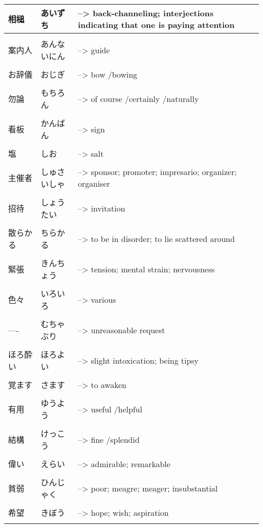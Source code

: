 \documentclass{article}
\begin{document}
\begin{tabular}{ l | l p{14cm}  }
相槌 & あいずち &--> back-channeling; interjections indicating that one is paying attention \\ \hline\\[-1em]
案内人 & あんないにん &--> guide \\ \hline\\[-1em]
お辞儀 & おじぎ &--> bow /bowing \\ \hline\\[-1em]
勿論 & もちろん &--> of course /certainly /naturally \\ \hline\\[-1em]
看板 & かんばん &--> sign \\ \hline\\[-1em]
塩 & しお &--> salt \\ \hline\\[-1em]
主催者 & しゅさいしゃ &--> sponsor; promoter; impresario; organizer; organiser \\ \hline\\[-1em]
招待 & しょうたい &--> invitation \\ \hline\\[-1em]
散らかる & ちらかる &--> to be in disorder; to lie scattered around \\ \hline\\[-1em]
緊張 & きんちょう &--> tension; mental strain; nervousness \\ \hline\\[-1em]
色々 & いろいろ &--> various \\ \hline\\[-1em]
---- & むちゃぶり &--> unreasonable request \\ \hline\\[-1em]
ほろ酔い & ほろよい &--> slight intoxication; being tipsy \\ \hline\\[-1em]
覚ます & さます &--> to awaken \\ \hline\\[-1em]
有用 & ゆうよう &--> useful /helpful \\ \hline\\[-1em]
結構 & けっこう &--> fine /splendid \\ \hline\\[-1em]
偉い & えらい &--> admirable; remarkable \\ \hline\\[-1em]
貧弱 & ひんじゃく &--> poor; meagre; meager; insubstantial \\ \hline\\[-1em]
希望 & きぼう &--> hope; wish; aspiration \\ \hline\\[-1em]

\end{tabular}
\end{document}
